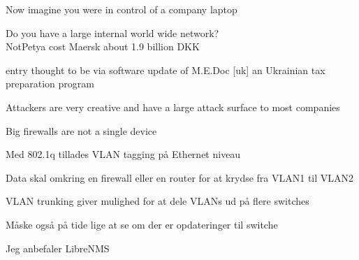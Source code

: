 \documentclass[Screen16to9,17pt]{foils}
\begin{document}
\begin{list2}
\item Now imagine you were in control of a company laptop
\item Do you have a large internal world wide network?\\
NotPetya cost Maersk about 1.9 billion DKK

\item entry thought to be via software update of M.E.Doc [uk] an Ukrainian tax preparation program
\item Attackers are very creative and have a large attack surface to most companies
\end{list2}



\centerline{Big firewalls are not a single device}





\begin{list1}
\item Med 802.1q tillades VLAN tagging på Ethernet niveau
\item Data skal omkring en firewall eller en router for at krydse fra VLAN1 til VLAN2
\item VLAN trunking giver mulighed for at dele VLANs ud på flere switches
\end{list1}




\begin{list2}
\item Måske også på tide lige at se om der er opdateringer til switche
\item Jeg anbefaler LibreNMS 
\end{list2}



\end{document}
